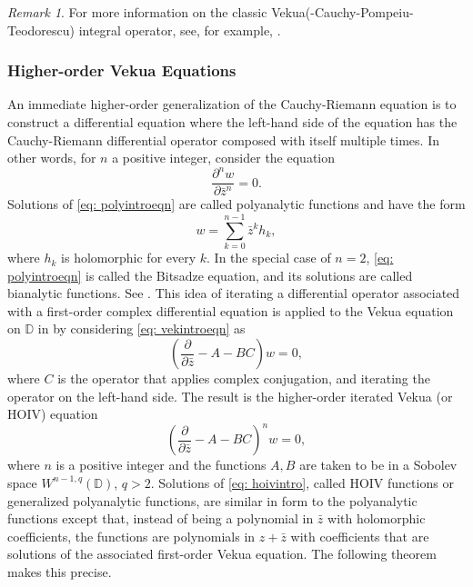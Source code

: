 \documentclass[12pt,reqno]{amsart}
\theoremstyle{definition}
\theoremstyle{remark}
\newtheorem{comm}[theorem]{Remark}
\newcommand{\p}{\partial}
\newcommand{\z}{\bar z}
\newcommand{\disk}{\mathbb{D}}
\begin{document}
        \begin{comm}
            For more information on the classic Vekua(-Cauchy-Pompeiu-Teodorescu) integral operator, see, for example, \cite{Vek, BegBook,ellipquasi}.
        \end{comm}
        
        


         \subsubsection{Higher-order Vekua Equations}\label{subsubsection: hoiv equations}

            An immediate higher-order generalization of the Cauchy-Riemann equation is to construct a differential equation where the left-hand side of the equation has the Cauchy-Riemann differential operator composed with itself multiple times. In other words, for $n$ a positive integer, consider the equation
            \begin{equation}\label{eq: polyintroeqn}
                \frac{\p^n w}{\p\z^n} = 0.
            \end{equation}
            Solutions of \eqref{eq: polyintroeqn} are called polyanalytic functions and have the form 
            \[
                w = \sum_{k=0}^{n-1} \z^k h_k,
            \]
            where $h_k$ is holomorphic for every $k$. In the special case of $n=2$, \eqref{eq: polyintroeqn} is called the Bitsadze equation, and its solutions are called bianalytic functions. See \cite{Balk}. This idea of iterating a differential operator associated with a first-order complex differential equation is applied to the Vekua equation on $\disk$ in \cite{metahardy, WB3, WBD, WBD2, itvek, itvekbvp} by considering \eqref{eq: vekintroeqn} as 
            \[
            \left( \frac{\p}{\p\z} - A- BC\right)w = 0,
            \]
            where $C$ is the operator that applies complex conjugation, and iterating the operator on the left-hand side. The result is the higher-order iterated Vekua (or HOIV) equation
            \begin{equation}\label{eq: hoivintro}
                \left( \frac{\p}{\p\z} - A- BC\right)^n w = 0,
            \end{equation}
            where $n$ is a positive integer and the functions $A, B$ are taken to be in a Sobolev space $W^{n-1, q}(\disk)$, $q>2$. Solutions of \eqref{eq: hoivintro}, called HOIV functions or generalized polyanalytic functions, are similar in form to the polyanalytic functions except that, instead of being a polynomial in $\z$ with holomorphic coefficients, the functions are polynomials in $z+\z$ with coefficients that are solutions of the associated first-order Vekua equation. The following theorem makes this precise. 
\end{document}
